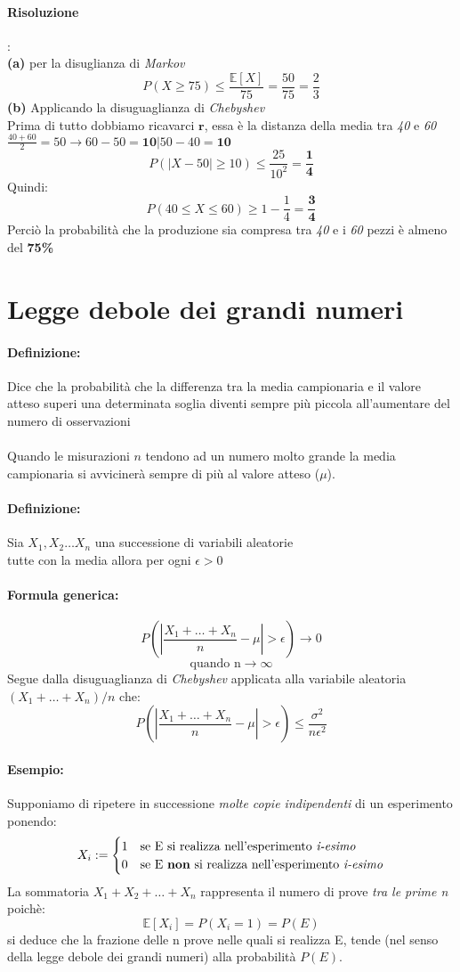 \documentclass[]{article}
\newcommand{\ev}{\mathbb{E}[X]}
\renewcommand{\ev}[1]{\mathbb{E}[#1]}
\newcommand{\definizione}{\paragraph{Definizione:}}
\newcommand{\formula}{\paragraph{Formula generica:}}
\begin{document}
    \paragraph{Risoluzione}: \\
    \textbf{(a)} per la disuglianza di \textit{Markov}
    \[ P(X \geq 75) \leq \frac{\ev{X}}{75} = \frac{50}{75} = \frac{2}{3}\]
    \textbf{(b)} Applicando la disuguaglianza di \textit{Chebyshev} \\ 
    Prima di tutto dobbiamo ricavarci $\boldsymbol{r}$, essa è la distanza della media tra \textit{40} e \textit{60} \\
    $\frac{40+60}{2} = 50 \longrightarrow 60 - 50 = \boldsymbol{10} \rvert 50 - 40 = \boldsymbol{10}$
    \[ P(|X - 50| \geq 10) \leq \frac{25}{10^2} = \boldsymbol{\frac{1}{4}} \]
    Quindi:
    \[ P(40 \leq X \leq 60) \geq 1 - \frac{1}{4} = \boldsymbol{\frac{3}{4}} \]
    Perciò la probabilità che la produzione sia compresa tra \textit{40} e i \textit{60} pezzi è almeno del \textbf{75\%}
    \newpage
    \section{Legge debole dei grandi numeri}
    \definizione Dice che la probabilità che la differenza tra la media campionaria e il valore atteso superi una determinata soglia diventi sempre più piccola all'aumentare del numero di osservazioni \\ \\
    Quando le misurazioni $n$ tendono ad un numero molto grande la media campionaria si avvicinerà sempre di più al valore atteso ($\mu$).
    \definizione Sia $X_1, X_2 \ldots X_n$ una successione di variabili aleatorie \\
    tutte con la media \boldsymbol{$\ev{X_i} =: \mu$} allora per ogni $\epsilon > 0$ 
    \formula
    \[ P(|\frac{X_1 + \ldots + X_n}{n} - \mu | > \epsilon) \longrightarrow 0 \] 
    \[ \text{quando n} \longrightarrow \infty \]
    Segue dalla disuguaglianza di \textit{Chebyshev} applicata alla variabile aleatoria $(X_1 + \ldots + X_n)/n$ che:
    \[ P(| \frac{X_1 + \ldots + X_n}{n} - \mu | > \epsilon) \leq \frac{\sigma^2}{n\epsilon^2}\]
    \paragraph{Esempio:} Supponiamo di ripetere in successione \textit{molte copie indipendenti} di un esperimento ponendo:
    \begin{equation*}
        X_i :=
        \begin{cases}
            1 & \text{se E si realizza nell'esperimento \textit{i-esimo}} \\
            0 & \text{se E \textbf{non} si realizza nell'esperimento \textit{i-esimo}}
        \end{cases}
    \end{equation*}
    La sommatoria $X_1 + X_2 + \ldots + X_n$ rappresenta il numero di prove \textit{tra le prime n} poichè:
    \[ \ev{X_i} = P(X_i = 1) = P(E) \]
    si deduce che la frazione delle n prove nelle quali si realizza E, tende (nel senso della
    legge debole dei grandi numeri) alla probabilità $P(E)$.
\end{document}

